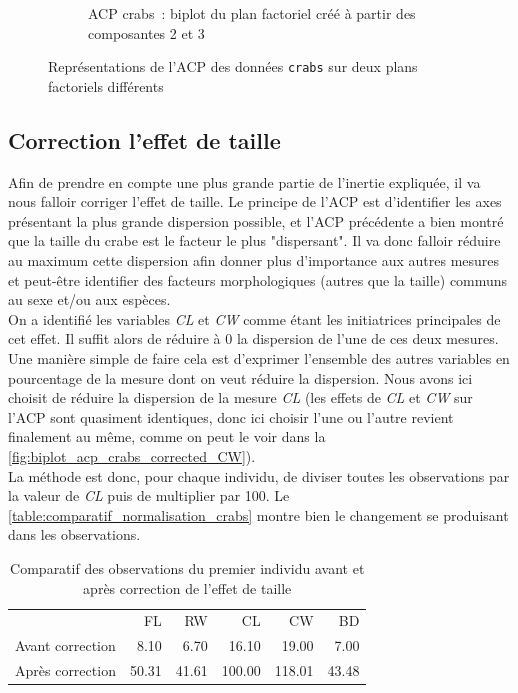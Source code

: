 \documentclass[a4paper,11pt]{report}
\begin{document}
\begin{figure}[H]
\begin{subfigure}[b]{0.5\linewidth}
		\caption{\scriptsize ACP crabs~: biplot du plan factoriel créé à partir des composantes 2 et 3}
		\label{fig:biplot_acp_crabs_plan_2_3}
	\end{subfigure}%
	\caption{
		\small Représentations de l'ACP des données \texttt{crabs} sur deux plans factoriels différents
	}
	\label{fig:biplots_crabs}%
\end{figure}



\subsection{Correction l'effet de taille}

Afin de prendre en compte une plus grande partie de l'inertie expliquée, il va nous falloir corriger l'effet de taille. Le principe de l'ACP est d'identifier les axes présentant la plus grande dispersion possible, et l'ACP précédente a bien montré que la taille du crabe est le facteur le plus "dispersant". Il va donc falloir réduire au maximum cette dispersion afin donner plus d'importance aux autres mesures et peut-être identifier des facteurs morphologiques (autres que la taille) communs au sexe et/ou aux espèces.\\
On a identifié les variables \textit{CL} et \textit{CW} comme étant les initiatrices principales de cet effet. Il suffit alors de réduire à 0 la dispersion de l'une de ces deux mesures. Une manière simple de faire cela est d'exprimer l'ensemble des autres variables en pourcentage de la mesure dont on veut réduire la dispersion. Nous avons ici choisit de réduire la dispersion de la mesure \textit{CL} (les effets de \textit{CL} et \textit{CW} sur l'ACP sont quasiment identiques, donc ici choisir l'une ou l'autre revient finalement au même, comme on peut le voir dans la \autoref{fig:biplot_acp_crabs_corrected_CW}).\\
La méthode est donc, pour chaque individu, de diviser toutes les observations par la valeur de \textit{CL} puis de multiplier par 100. Le \autoref{table:comparatif_normalisation_crabs} montre bien le changement se produisant dans les observations.

\begin{table}[H]
	\centering
	\captionsetup{justification=centering, margin=4cm}
	\caption{\scriptsize Comparatif des observations du premier individu avant et après correction de l'effet de taille}
	\label{table:comparatif_normalisation_crabs}
	\begin{tabular}{lrrrrr}
		& FL & RW & CL & CW & BD \\ 
		Avant correction & 8.10 & 6.70 & 16.10 & 19.00 & 7.00 \\ 
		Après correction & 50.31 & 41.61 & 100.00 & 118.01 & 43.48 \\ 
	\end{tabular}
\end{table}
\end{document}
